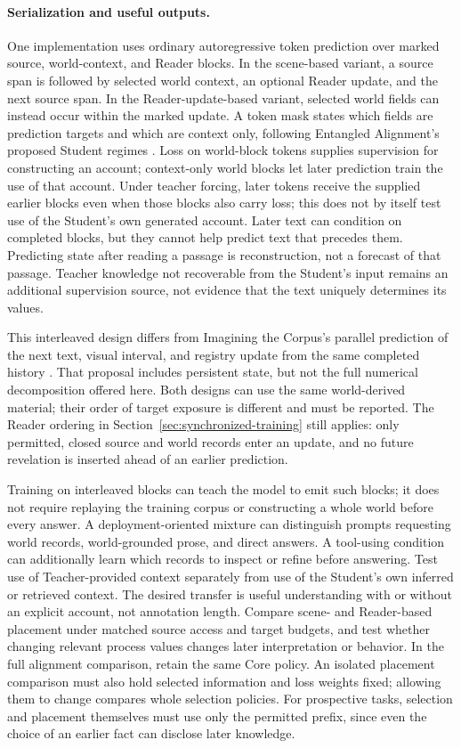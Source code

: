 \documentclass[10pt]{article}
\begin{document}
\paragraph{Serialization and useful outputs.}
One implementation uses ordinary autoregressive token prediction over marked
source, world-context, and Reader blocks. In the scene-based variant, a source
span is followed by selected world context, an optional Reader update, and
the next source span. In the Reader-update-based variant, selected world
fields can instead occur within the marked update. A token mask states which
fields are prediction targets and which are context only, following Entangled
Alignment's proposed Student regimes \cite{westerbergEntangled2026}. Loss on
world-block tokens supplies supervision for constructing an account;
context-only world blocks let later prediction train the use of that account.
Under teacher forcing, later tokens receive the supplied earlier blocks even
when those blocks also carry loss; this does not by itself test use of the
Student's own generated account.
Later text can condition on completed blocks,
but they cannot help predict text that precedes them. Predicting state after
reading a passage is reconstruction, not a forecast of that passage. Teacher
knowledge not recoverable from the Student's input remains an additional
supervision source, not evidence that the text uniquely determines its values.

This interleaved design differs from Imagining the Corpus's parallel prediction
of the next text, visual interval, and registry update from the same completed
history \cite{westerbergImagining2026}. That proposal includes persistent state,
but not the full numerical decomposition offered here. Both designs can use
the same world-derived material; their order of target exposure is different
and must be reported. The Reader ordering in
Section~\ref{sec:synchronized-training} still applies: only permitted, closed
source and world records enter an update, and no future revelation is inserted
ahead of an earlier prediction.

Training on interleaved blocks can teach the model to emit such blocks; it does
not require replaying the training corpus or constructing a whole world before
every answer. A deployment-oriented mixture can distinguish prompts requesting
world records, world-grounded prose, and direct answers. A tool-using condition
can additionally learn which records to inspect or refine before answering.
Test use of Teacher-provided context separately from use of the Student's own
inferred or retrieved context. The desired transfer is useful understanding
with or without an explicit account, not annotation length. Compare scene- and
Reader-based placement under matched source access and target budgets, and
test whether changing relevant process values changes later interpretation or
behavior. In the full alignment comparison, retain the same Core policy.
An isolated placement comparison must also hold selected information and loss
weights fixed; allowing them to change compares whole selection policies.
For prospective tasks, selection and placement themselves must use only the
permitted prefix, since even the choice of an earlier fact can disclose later
knowledge.
\end{document}
